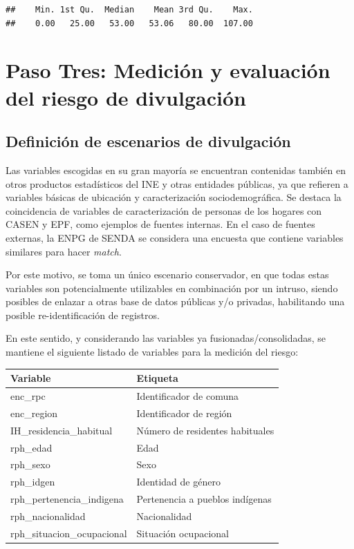 \documentclass[]{book}
\theoremstyle{definition}
\theoremstyle{definition}
\theoremstyle{definition}
\theoremstyle{definition}
\theoremstyle{remark}
\begin{document}
\begin{verbatim}
##    Min. 1st Qu.  Median    Mean 3rd Qu.    Max. 
##    0.00   25.00   53.00   53.06   80.00  107.00
\end{verbatim}

\hypertarget{paso-tres-mediciuxf3n-y-evaluaciuxf3n-del-riesgo-de-divulgaciuxf3n}{%
\section{Paso Tres: Medición y evaluación del riesgo de divulgación}\label{paso-tres-mediciuxf3n-y-evaluaciuxf3n-del-riesgo-de-divulgaciuxf3n}}

\hypertarget{definiciuxf3n-de-escenarios-de-divulgaciuxf3n}{%
\subsection{Definición de escenarios de divulgación}\label{definiciuxf3n-de-escenarios-de-divulgaciuxf3n}}

Las variables escogidas en su gran mayoría se encuentran contenidas también en otros productos estadísticos del INE y otras entidades públicas, ya que refieren a variables básicas de ubicación y caracterización sociodemográfica. Se destaca la coincidencia de variables de caracterización de personas de los hogares con CASEN y EPF, como ejemplos de fuentes internas. En el caso de fuentes externas, la ENPG de SENDA se considera una encuesta que contiene variables similares para hacer \emph{match}.

Por este motivo, se toma un único escenario conservador, en que todas estas variables son potencialmente utilizables en combinación por un intruso, siendo posibles de enlazar a otras base de datos públicas y/o privadas, habilitando una posible re-identificación de registros.

En este sentido, y considerando las variables ya fusionadas/consolidadas, se mantiene el siguiente listado de variables para la medición del riesgo:

\begin{longtable}[]{@{}ll@{}}
\toprule
Variable & Etiqueta\tabularnewline
\midrule
\endhead
enc\_rpc & Identificador de comuna\tabularnewline
enc\_region & Identificador de región\tabularnewline
IH\_residencia\_habitual & Número de residentes habituales\tabularnewline
rph\_edad & Edad\tabularnewline
rph\_sexo & Sexo\tabularnewline
rph\_idgen & Identidad de género\tabularnewline
rph\_pertenencia\_indigena & Pertenencia a pueblos indígenas\tabularnewline
rph\_nacionalidad & Nacionalidad\tabularnewline
rph\_situacion\_ocupacional & Situación ocupacional\tabularnewline
\bottomrule
\end{longtable}
\end{document}
